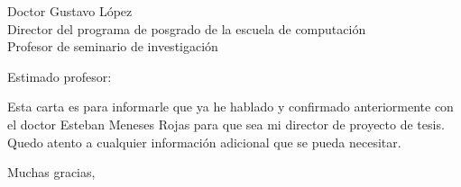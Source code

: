 \documentclass{letter}
\begin{document}
\begin{letter}{Doctor Gustavo L\'opez \\ Director del programa de posgrado de la escuela de computaci\'on \\ Profesor de seminario de investigaci\'on}
  
  \opening{Estimado profesor:}
  Esta carta es para informarle que ya he hablado y confirmado anteriormente con el doctor Esteban Meneses Rojas para que sea mi director de proyecto de tesis. Quedo atento a cualquier informaci\'on adicional que se pueda necesitar. 
  \closing{Muchas gracias,}
\end{letter}
\end{document}
